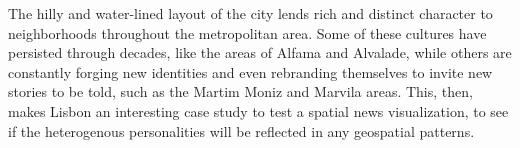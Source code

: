 
The hilly and water-lined layout of the city lends rich and distinct character to neighborhoods throughout the metropolitan area. Some of these cultures have persisted through decades, like the areas of Alfama and Alvalade, while others are constantly forging new identities and even rebranding themselves to invite new stories to be told, such as the Martim Moniz and Marvila areas. This, then, makes Lisbon an interesting case study to test a spatial news visualization, to see if the heterogenous personalities will be reflected in any geospatial patterns.




